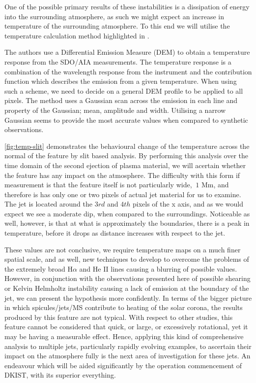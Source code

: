 One of the possible primary results of these instabilities is a dissipation of energy into the surrounding atmosphere, as such we might expect an increase in temperature of the surrounding atmosphere.
To this end we will utilise the temperature calculation method highlighted in \cite{Leonard2014}.

The authors use a Differential Emission Measure (DEM) to obtain a temperature response from the SDO/AIA measurements.
The temperature response is a combination of the wavelength response from the instrument and the contribution function which describes the emission from a given temperature.
When using such a scheme, we need to decide on a general DEM profile to be applied to all pixels.
The method uses a Gaussian scan across the emission in each line and property of the Gaussian; mean, amplitude and width. 
Utilising a narrow Gaussian seems to provide the most accurate values when compared to synthetic observations.

\cref{fig:temp-slit} demonstrates the behavioural change of the temperature across the normal of the feature by slit based analysis.
By performing this analysis over the time domain of the second ejection of plasma material, we will acertain whether the feature has any impact on the atmosphere.
The difficulty with this form if measurement is that the feature itself is not particularly wide, $~1$ Mm, and therefore is has only one or two pixels of actual jet material for us to examine.
The jet is located around the $3rd$ and $4th$ pixels of the x axis, and as we would expect we see a moderate dip, when compared to the surroundings. 
Noticeable as well, however, is that at what is approximately the boundaries, there is a peak in temperature, before it drops as distance increases with respect to the jet.

These values are not conclusive, we require temperature maps on a much finer spatial scale, and as well, new techniques to develop to overcome the problems of the extremely broad H$\alpha$ and He II lines causing a blurring of possible values.
However, in conjunction with the observations presented here of possible shearing or Kelvin Helmholtz instability causing a lack of emission at the boundary of the jet, we can present the hypothesis more confidently.
In terms of the bigger picture in which spicules/jets/MS contribute to heating of the solar corona, the results produced by this feature are not typical.
With respect to other studies, this feature cannot be considered that quick, or large, or excessively rotational, yet it may be having a measurable effect.
Hence, applying this kind of comprehensive analysis to multiple jets, particularly rapidly evolving examples, to ascertain their impact on the atmosphere fully is the next area of investigation for these jets.
An endeavour which will be aided significantly by the operation commencement of DKIST, with its superior everything.
 


